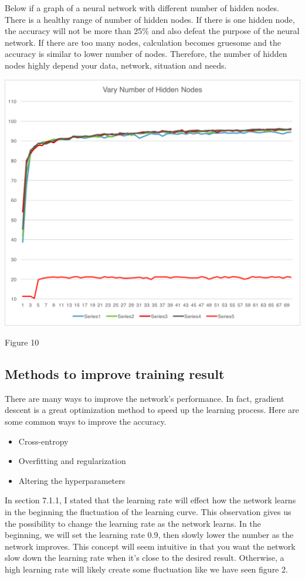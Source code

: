 \documentclass[]{article}
\begin{document}
\begin{multicols}{2}
Below if a graph of a neural network with different number of hidden nodes. There is a healthy range of number of hidden nodes. If there is one hidden node, the accuracy will not be more than 25\% and also defeat the purpose of the neural network. If there are too many nodes, calculation becomes gruesome and the accuracy is similar to lower number of nodes. Therefore, the number of hidden nodes highly depend your data, network, situation and needs. 

\centerline{\includegraphics[width=1\linewidth]{graph6}}
\centerline{Figure 10}
\vspace{0.5cm}

\subsection{Methods to improve training result}

There are many ways to improve the network's performance. In fact, gradient descent is a great optimization method to speed up the learning process. Here are some common ways to improve the accuracy. 

\begin{itemize}
	\item Cross-entropy
	\item Overfitting and regularization
	\item Altering the hyperparameters
\end{itemize}

In section 7.1.1, I stated that the learning rate will effect how the network learns in the beginning the fluctuation of the learning curve. This observation gives us the possibility to change the learning rate as the network learns. In the beginning, we will set the learning rate 0.9, then slowly lower the number as the network improves. 
This concept will seem intuitive in that you want the network slow down the learning rate when it's close to the desired result. Otherwise, a high learning rate will likely create some fluctuation like we have seen figure 2. 


\end{multicols}
\end{document}
